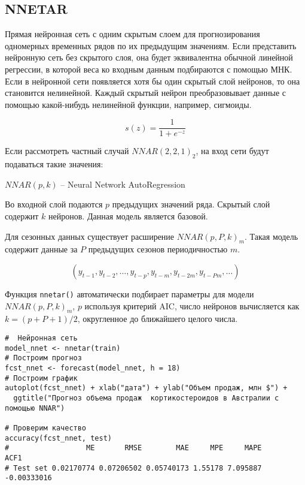 \documentclass[a4paper,12pt]{article}
\theoremstyle{plain} %
\theoremstyle{definition} %
\theoremstyle{remark} %
\begin{document}
\newpage
\subsection{NNETAR}
Прямая нейронная сеть с одним скрытым слоем для прогнозирования одномерных временных рядов по их предыдущим значениям.
Если представить нейронную сеть без скрытого слоя, она будет эквивалентна обычной линейной регрессии, в которой веса ко входным данным подбираются с помощью МНК.
Если в нейронной сети появляется хотя бы один скрытый слой нейронов, то она становится нелинейной.
Каждый скрытый нейрон преобразовывает данные с помощью какой-нибудь нелинейной функции, например, сигмоиды.

\begin{equation}
  s(z) = \frac{1}{1+e^{-z}}
\end{equation}

\vspace{3ex}

Если рассмотреть частный случай $NNAR(2,2,1)_2$, на вход сети будут подаваться такие значения:

\begin{figure}[H]
  \noindent{}
\end{figure}



\vspace{2ex}

$NNAR(p,k)$ -- Neural Network AutoRegression

Во входной слой подаются $p$ предыдущих значений ряда.
Скрытый слой содержит $k$ нейронов. Данная модель является базовой.

Для сезонных данных существует расширение  $NNAR(p,P,k)_m$.
Такая модель содержит данные за $P$ предыдущих сезонов периодичностью $m$.

\begin{equation}
  (y_{t-1},y_{t-2},\dots,y_{t-p},y_{t-m},y_{t-2m},y_{t-Pm},\dots)
\end{equation}

Функция  \verb|nnetar()| автоматически подбирает параметры для модели $NNAR(p, P, k)_m$, $p$ используя критерий AIC, число нейронов вычисляется как $k=(p+P+1)/2$, округленное до ближайшего целого числа.

\begin{verbatim}
#  Нейронная сеть
model_nnet <- nnetar(train)
# Построим прогноз
fcst_nnet <- forecast(model_nnet, h = 18)
# Построим график
autoplot(fcst_nnet) + xlab("дата") + ylab("Объем продаж, млн $") +
  ggtitle("Прогноз объема продаж  кортикостероидов в Австралии с помощью NNAR")

# Проверим качество
accuracy(fcst_nnet, test)
#                  ME       RMSE        MAE     MPE     MAPE        ACF1
# Test set 0.02170774 0.07206502 0.05740173 1.55178 7.095887 -0.00333016

\end{verbatim}
\end{document}
